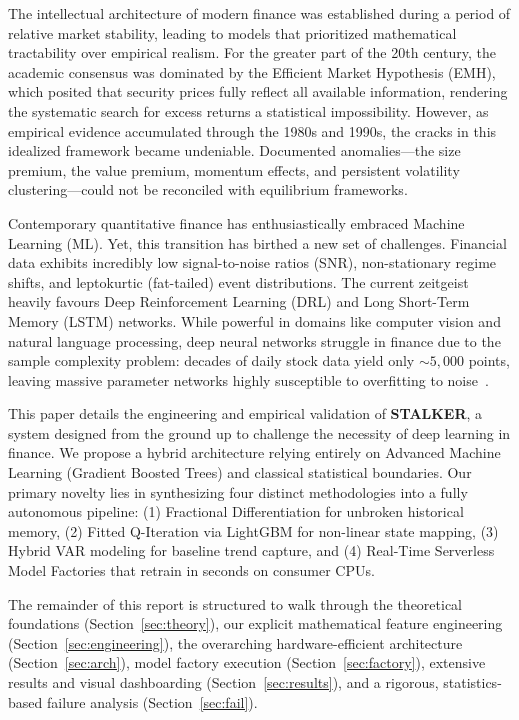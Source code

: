 \documentclass[journal,10pt,twocolumn]{IEEEtran}
\begin{document}
The intellectual architecture of modern finance was established during a period of relative market stability, leading to models that prioritized mathematical tractability over empirical realism. For the greater part of the 20th century, the academic consensus was dominated by the Efficient Market Hypothesis (EMH), which posited that security prices fully reflect all available information, rendering the systematic search for excess returns a statistical impossibility. However, as empirical evidence accumulated through the 1980s and 1990s, the cracks in this idealized framework became undeniable. Documented anomalies---the size premium, the value premium, momentum effects, and persistent volatility clustering---could not be reconciled with equilibrium frameworks. 

Contemporary quantitative finance has enthusiastically embraced Machine Learning (ML). Yet, this transition has birthed a new set of challenges. Financial data exhibits incredibly low signal-to-noise ratios (SNR), non-stationary regime shifts, and leptokurtic (fat-tailed) event distributions. The current zeitgeist heavily favours Deep Reinforcement Learning (DRL) and Long Short-Term Memory (LSTM) networks. While powerful in domains like computer vision and natural language processing, deep neural networks struggle in finance due to the sample complexity problem: decades of daily stock data yield only ${\sim}5{,}000$ points, leaving massive parameter networks highly susceptible to overfitting to noise~\cite{gu2020empirical}.

This paper details the engineering and empirical validation of \textbf{STALKER}, a system designed from the ground up to challenge the necessity of deep learning in finance. We propose a hybrid architecture relying entirely on Advanced Machine Learning (Gradient Boosted Trees) and classical statistical boundaries. Our primary novelty lies in synthesizing four distinct methodologies into a fully autonomous pipeline: (1) Fractional Differentiation for unbroken historical memory, (2) Fitted Q-Iteration via LightGBM for non-linear state mapping, (3) Hybrid VAR modeling for baseline trend capture, and (4) Real-Time Serverless Model Factories that retrain in seconds on consumer CPUs. 

The remainder of this report is structured to walk through the theoretical foundations (Section~\ref{sec:theory}), our explicit mathematical feature engineering (Section~\ref{sec:engineering}), the overarching hardware-efficient architecture (Section~\ref{sec:arch}), model factory execution (Section~\ref{sec:factory}), extensive results and visual dashboarding (Section~\ref{sec:results}), and a rigorous, statistics-based failure analysis (Section~\ref{sec:fail}).
\end{document}

